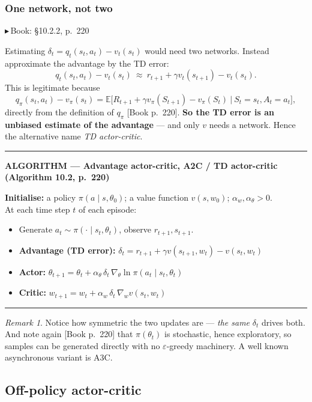 \documentclass[11pt, letterpaper]{article}
\theoremstyle{runin}
\theoremstyle{runinplain}
\theoremstyle{remark}
\newtheorem*{remark}{Remark}
\newcommand{\E}{\mathbb{E}}
\newcommand{\bk}[1]{{\color{bookblue}\small$\blacktriangleright$\,\textsf{Book: #1}}}
\newcommand{\bkin}[1]{{\color{bookblue}\small[\textsf{Book #1}]}}
\newenvironment{algobox}[1]
  {\par\medskip\noindent\rule{\textwidth}{0.9pt}\par\nobreak\vspace{0.25em}
   \noindent\textbf{\small ALGORITHM --- #1}\par\nobreak\vspace{0.15em}
   \small}
  {\par\nobreak\vspace{0.25em}\noindent\rule{\textwidth}{0.9pt}\par\medskip}
\begin{document}
\subsubsection{One network, not two}

\bk{\S10.2.2, p.~220}

Estimating $\delta_t=q_t(s_t,a_t)-v_t(s_t)$ would need two networks. Instead
approximate the advantage by the TD error:
\[
  q_t(s_t,a_t)-v_t(s_t)\ \approx\ r_{t+1}+\gamma v_t(s_{t+1})-v_t(s_t).
\]
This is legitimate because
\[
  q_\pi(s_t,a_t)-v_\pi(s_t)=\E\bigl[R_{t+1}+\gamma v_\pi(S_{t+1})-v_\pi(S_t)\ \big|\ S_t=s_t,A_t=a_t\bigr],
\]
directly from the definition of $q_\pi$ \bkin{p.~220}. \textbf{So the TD error is an
unbiased estimate of the advantage} --- and only $v$ needs a network. Hence the
alternative name \emph{TD actor-critic}.

\begin{algobox}{Advantage actor-critic, A2C / TD actor-critic (Algorithm 10.2, p.~220)}
\textbf{Initialise:} a policy $\pi(a\mid s,\theta_0)$; a value function $v(s,w_0)$;
$\alpha_w,\alpha_\theta>0$.\\
At each time step $t$ of each episode:
\begin{itemize}\itemsep0pt
  \item Generate $a_t\sim\pi(\cdot\mid s_t,\theta_t)$, observe $r_{t+1},s_{t+1}$.
  \item \textbf{Advantage (TD error):}
        $\delta_t=r_{t+1}+\gamma v(s_{t+1},w_t)-v(s_t,w_t)$
  \item \textbf{Actor:}
        $\theta_{t+1}=\theta_t+\alpha_\theta\,\delta_t\,\nabla_\theta\ln\pi(a_t\mid s_t,\theta_t)$
  \item \textbf{Critic:}
        $w_{t+1}=w_t+\alpha_w\,\delta_t\,\nabla_w v(s_t,w_t)$
\end{itemize}
\end{algobox}

\begin{remark}
Notice how symmetric the two updates are --- \emph{the same} $\delta_t$ drives both.
And note again \bkin{p.~220} that $\pi(\theta_t)$ is stochastic, hence exploratory,
so samples can be generated directly with no $\varepsilon$-greedy machinery. A well
known asynchronous variant is A3C.
\end{remark}

\subsection{Off-policy actor-critic}
\end{document}
